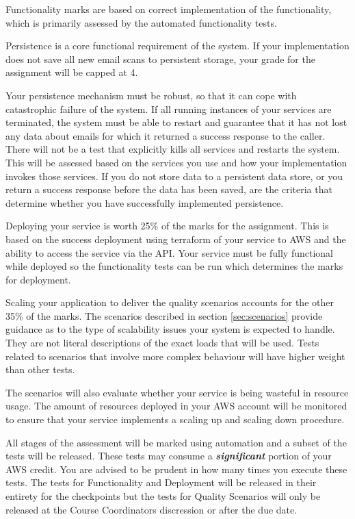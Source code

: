 \documentclass{csse4400}
\begin{document}
Functionality marks are based on correct implementation of the functionality, which is primarily assessed by the automated functionality tests.

Persistence is a core functional requirement of the system. If your implementation does not save all new email scans to persistent storage, your grade for the assignment will be capped at 4.

Your persistence mechanism must be robust, so that it can cope with catastrophic failure of the system. If all running instances of your services are terminated, the system must be able to restart and guarantee that it has not lost any data about emails for which it returned a success response to the caller. There will not be a test that explicitly kills all services and restarts the system. This will be assessed based on the services you use and how your implementation invokes those services. If you do not store data to a persistent data store, or you return a success response before the data has been saved, are the criteria that determine whether you have successfully implemented persistence.

Deploying your service is worth 25\% of the marks for the assignment. This is based on the success deployment using terraform of your service to AWS and the ability to access the service via the API. Your service must be fully functional while deployed so the functionality tests can be run which determines the marks for deployment.

Scaling your application to deliver the quality scenarios accounts for the other 35\% of the marks. The scenarios described in section \ref{sec:scenarios} provide guidance as to the type of scalability issues your system is expected to handle. They are not literal descriptions of the exact loads that will be used. Tests related to scenarios that involve more complex behaviour will have higher weight than other tests.

The scenarios will also evaluate whether your service is being wasteful in resource usage. The amount of resources deployed in your AWS account will be monitored to ensure that your service implements a scaling up and scaling down procedure.

All stages of the assessment will be marked using automation and a subset of the tests will be released. These tests may consume a \textbf{\emph{significant}} portion of your AWS credit. You are advised to be prudent in how many times you execute these tests. The tests for Functionality and Deployment will be released in their entirety for the checkpoints but the tests for Quality Scenarios will only be released at the Course Coordinators discression or after the due date.
\end{document}
